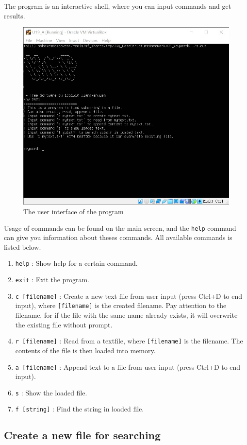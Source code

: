 \documentclass[cn,black,12pt,normal]{elegantnote}
\begin{document}
The program is an interactive shell, where you can input commands and get results.

\begin{figure}[H]
    \centering
    \includegraphics[width=0.6\linewidth]{image/kmp_01.jpg}
    \caption{The user interface of the program}
\end{figure}

Usage of commands can be found on the main screen, and the \lstinline{help} command can give you information about theses commands.  All available commands is listed below.

\begin{enumerate}
    \item \lstinline{help} : Show help for a certain command.
    \item \lstinline{exit} : Exit the program.
    \item \lstinline{c [filename]} : Create a new text file from user input (press Ctrl+D to end input), where \lstinline{[filename]} is the created filename. Pay attention to the filename, for if the file with the same name already exists, it will overwrite the existing file without prompt.
    \item \lstinline{r [filename]} : Read from a textfile, where \lstinline{[filename]} is the filename. The contents of the file is then loaded into memory.
    \item \lstinline{a [filename]} : Append text to a file from user input (press Ctrl+D to end input).
    \item \lstinline{s} : Show the loaded file.
    \item \lstinline{f [string]} : Find the string in loaded file.
\end{enumerate}

\subsection{Create a new file for searching}
\end{document}
